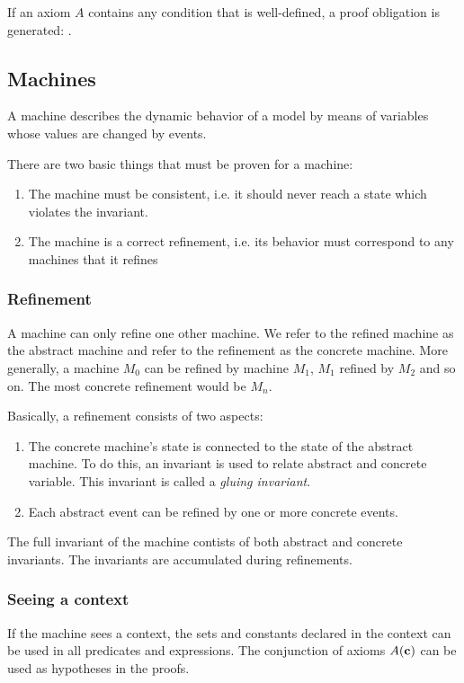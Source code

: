 If an axiom $A$ contains any condition that is well-defined, a proof obligation is generated:
.


\subsection{Machines}
A machine describes the dynamic behavior of a model by means of variables whose values are changed by events.

There are two basic things that must be proven for a machine:
\begin{enumerate}
	\item The machine must be consistent, i.e. it should never reach a state which violates the invariant.
	\item The machine is a correct refinement, i.e. its behavior must correspond to any machines that it refines
\end{enumerate}

\subsubsection{Refinement}
A machine can only refine one other machine. 
We refer to the refined machine as the abstract machine and refer to the refinement as the concrete machine. 
More generally, a machine $M_0$ can be refined by machine $M_1$, $M_1$ refined by $M_2$ 
and so on. The most concrete refinement would be $M_n$. 

Basically, a refinement consists of two aspects:
\begin{enumerate}
	\item The concrete machine's state is connected to the state of the
      abstract machine. To do this, an invariant is used to relate abstract and concrete variable. 
      This invariant is called a \emph{gluing invariant}. 
	\item Each abstract event can be refined by one or more
concrete events.
\end{enumerate}

The full invariant of the machine contists of both abstract and concrete invariants. 
The invariants are accumulated during refinements.

\subsubsection{Seeing a context}
If the machine sees a context, the sets and constants declared in the context can be used in
 all predicates and expressions.
The conjunction of axioms $A(\mathbf{c})$ can be used as hypotheses in the proofs.

